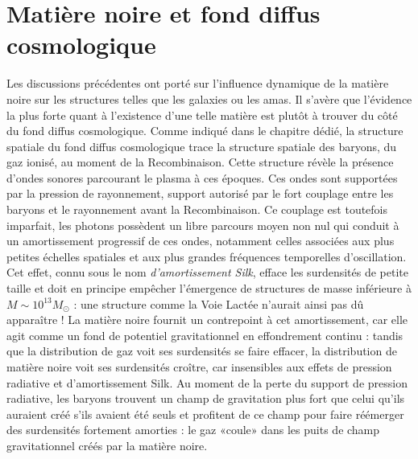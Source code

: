 \section{Matière noire et fond diffus cosmologique}

Les discussions précédentes ont porté sur l'influence dynamique de la matière noire sur les structures telles que les galaxies ou les amas. Il s'avère que l'évidence la plus forte quant à l'existence d'une telle matière est plutôt à trouver du côté du fond diffus cosmologique. Comme indiqué dans le chapitre dédié, la structure spatiale du fond diffus cosmologique trace la structure spatiale des baryons, du gaz ionisé, au moment de la Recombinaison. Cette structure révèle la présence d'ondes sonores parcourant le plasma à ces époques. Ces ondes sont supportées par la pression de rayonnement, support autorisé par le fort couplage entre les baryons et le rayonnement avant la Recombinaison. Ce couplage est toutefois imparfait, les photons possèdent un libre parcours moyen non nul qui conduit à un amortissement progressif de ces ondes, notamment celles associées aux plus petites échelles spatiales et aux plus grandes fréquences temporelles d'oscillation. Cet effet, connu sous le nom \textit{d'amortissement Silk},  efface les surdensités de petite taille et doit en principe empêcher l'émergence de structures de masse inférieure à $M\sim 10^{13} M_\odot$ : une structure comme la Voie Lactée n'aurait ainsi pas dû apparaître ! La matière noire fournit un contrepoint à cet amortissement, car elle agit comme un fond de potentiel gravitationnel en effondrement continu : tandis que la distribution de gaz voit ses surdensités se faire effacer, la distribution de matière noire voit ses surdensités croître, car insensibles aux effets de pression radiative et d'amortissement Silk. Au moment de la perte du support de pression radiative, les baryons trouvent un champ de gravitation plus fort que celui qu'ils auraient créé s'ils avaient été seuls et profitent de ce champ pour faire réémerger des surdensités fortement amorties : le gaz «coule» dans les puits de champ gravitationnel créés par la matière noire. 

